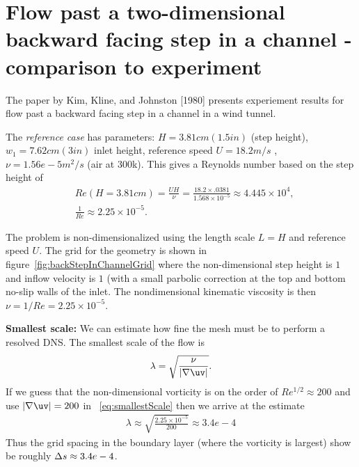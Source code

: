 \documentclass[11pt]{article}
\newcommand{\grad}{\nabla}
\begin{document}
\section{Flow past a two-dimensional backward facing step in a channel - comparison to experiment }

The paper by Kim, Kline, and Johnston [1980] presents experiement results for flow past a
backward facing step in a channel in a wind tunnel. 

The {\em reference case} has parameters: $H=3.81 cm (1.5 in)$ (step height), $w_1 = 7.62cm (3 in)$ inlet height,
reference speed $U=18.2 m/s$ , $\nu=1.56 e-5 m^2/s$ (air at 300k). This gives
a Reynolds number based on the step height of
\begin{align*}
 &  Re(H=3.81 cm) = \frac{U H}{\nu} = \frac{18.2 \times .0381}{1.568 \times 10^{-5}} \approx  4.445 \times 10^4, \\
 &  \frac{1}{Re} \approx 2.25 \times 10^{-5}. 
\end{align*}

The problem is non-dimensionalized using the length scale $L=H$ and reference speed $U$. 
The grid for the geometry is shown in figure~\ref{fig:backStepInChannelGrid} where the non-dimensional
step height is $1$ and inflow velocity is $1$ (with a small parbolic correction at the top and bottom
no-slip walls of the inlet. The nondimensional kinematic viscosity is then $\nu= 1/Re = 2.25 \times 10^{-5}$. 

{\bf Smallest scale:} We can estimate how fine the mesh must be to perform a resolved DNS.
The smallest scale of the flow is~\cite{HKR1}
\begin{align}
    \lambda = \sqrt{\frac{\nu}{|\grad\uv|}}.  \label{eq:smallestScale}
\end{align}
If we guess that the non-dimensional vorticity is on the order of $Re^{1/2} \approx 200$ and use $|\grad\uv|=200$ in ~\eqref{eq:smallestScale}
then we arrive at the estimate 
\begin{align*}
    \lambda \approx  \sqrt{\frac{2.25 \times 10^{-5}}{200}} \approx 3.4e-4
\end{align*}
Thus the grid spacing in the boundary layer (where the vorticity is largest) show be roughly $\Delta s\approx 3.4e-4$.
\end{document}
